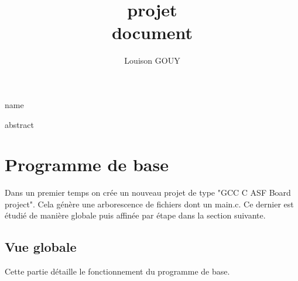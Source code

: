\documentclass[a4paper]{article}
\title{\textbf{projet} \\ document}
\author{Louison GOUY}
\begin{document}
\maketitle

\vspace{2cm}

\begin{center}
\end{center}

\vspace*{1cm}

\begin{center}
    name
\end{center}

\vspace*{7cm}

\begin{center}

abstract

\end{center}
\newpage
\renewcommand{\contentsname}{Table des Matières}
\tableofcontents
\newpage
\renewcommand\listfigurename{Liste des figures}
\listoffigures
\newpage


\section{Programme de base} %

Dans un premier temps on crée un nouveau projet de type "GCC C ASF Board project". Cela génère une arborescence de fichiers dont un main.c. Ce dernier est étudié de manière globale puis affinée par étape dans la section suivante.

\subsection{Vue globale}
Cette partie détaille le fonctionnement du programme de base. 
\end{document}
